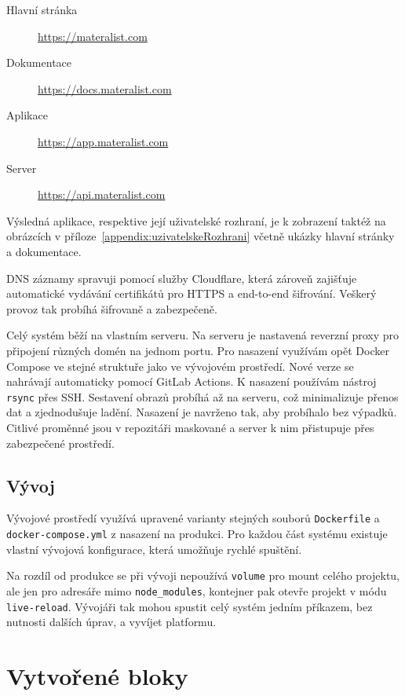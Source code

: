 \begin{description}
    \item[Hlavní stránka] \href{https://materalist.com}{https://materalist.com}
    \item[Dokumentace] \href{https://docs.materalist.com}{https://docs.materalist.com}
    \item[Aplikace] \href{https://app.materalist.com}{https://app.materalist.com}
    \item[Server] \href{https://api.materalist.com}{https://api.materalist.com}
\end{description}

Výsledná aplikace, respektive její uživatelské rozhraní, je k zobrazení taktéž na obrázcích v příloze~\ref{appendix:uzivatelskeRozhrani} včetně ukázky hlavní stránky a dokumentace.

DNS záznamy spravuji pomocí služby Cloudflare, která zároveň zajišťuje automatické vydávání certifikátů pro HTTPS a end-to-end šifrování. 
Veškerý provoz tak probíhá šifrovaně a zabezpečeně.

Celý systém běží na vlastním serveru. 
Na serveru je nastavená reverzní proxy pro připojení různých domén na jednom portu.
Pro nasazení využívám opět Docker Compose ve stejné struktuře jako ve vývojovém prostředí.
Nové verze se nahrávají automaticky pomocí GitLab Actions. 
K nasazení používám nástroj \texttt{rsync} přes SSH. 
Sestavení obrazů probíhá až na serveru, což minimalizuje přenos dat a zjednodušuje ladění. 
Nasazení je navrženo tak, aby probíhalo bez výpadků. 
Citlivé proměnné jsou v repozitáři maskované a server k nim přistupuje přes zabezpečené prostředí.

\subsection{Vývoj}

Vývojové prostředí využívá upravené varianty stejných souborů \texttt{Dockerfile} a \texttt{docker-compose.yml} z nasazení na produkci. 
Pro každou část systému existuje vlastní vývojová konfigurace, která umožňuje rychlé spuštění.

Na rozdíl od produkce se při vývoji nepoužívá \texttt{volume} pro mount celého projektu, ale jen pro adresáře mimo \texttt{node\_modules}, kontejner pak otevře projekt v módu \texttt{live-reload}.
Vývojáři tak mohou spustit celý systém jedním příkazem, bez nutnosti dalších úprav, a vyvíjet platformu.

\section{Vytvořené bloky}\label{text:realizace/vytvoreneBloky}

